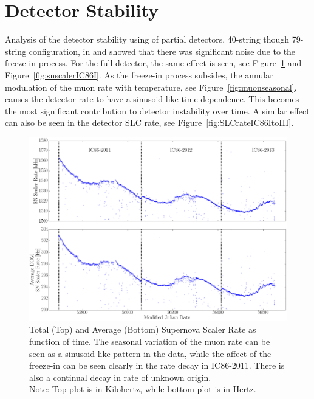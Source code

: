 \section{Detector Stability}

Analysis of the detector stability using of partial detectors, 40-string though 79-string configuration, in \cite{vbaumaster} and \cite{mkrasbergtalk} showed that there was significant noise due to the freeze-in process. For the full detector, the same effect is seen, see Figure~\ref{fig:snscalerIC86ItoIII} and Figure~\ref{fig:snscalerIC86I}. As the freeze-in process subsides, the annular modulation of the muon rate with temperature, see Figure~\ref{fig:muonseasonal}, causes the detector rate to have a sinusoid-like time dependence. This becomes the most significant contribution to detector instability over time. A similar effect can also be seen in the detector SLC rate, see Figure~\ref{fig:SLCrateIC86ItoIII}. 

\begin{figure}[h]
  \begin{center}
    \includegraphics[width=1\textwidth]{./figures/SNScalerRateTotalAvgIC86I_III.png} 
  \end{center}
  \caption{ Total (Top) and Average (Bottom) Supernova Scaler Rate as function of time. The seasonal variation of the muon rate can be seen as a sinusoid-like pattern in the data, while the affect of the freeze-in can be seen clearly in the rate decay in IC86-2011. There is also a continual decay in rate of unknown origin.\\
  Note: Top plot is in Kilohertz, while bottom plot is in Hertz.\label{fig:snscalerIC86ItoIII}}   
\end{figure}

